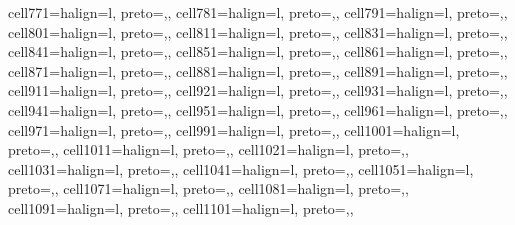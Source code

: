 \begin{table}
\begin{talltblr}
{cell{77}{1}={}{halign=l, preto={\hspace{1em}},},
cell{78}{1}={}{halign=l, preto={\hspace{1em}},},
cell{79}{1}={}{halign=l, preto={\hspace{1em}},},
cell{80}{1}={}{halign=l, preto={\hspace{1em}},},
cell{81}{1}={}{halign=l, preto={\hspace{1em}},},
cell{83}{1}={}{halign=l, preto={\hspace{1em}},},
cell{84}{1}={}{halign=l, preto={\hspace{1em}},},
cell{85}{1}={}{halign=l, preto={\hspace{1em}},},
cell{86}{1}={}{halign=l, preto={\hspace{1em}},},
cell{87}{1}={}{halign=l, preto={\hspace{1em}},},
cell{88}{1}={}{halign=l, preto={\hspace{1em}},},
cell{89}{1}={}{halign=l, preto={\hspace{1em}},},
cell{91}{1}={}{halign=l, preto={\hspace{1em}},},
cell{92}{1}={}{halign=l, preto={\hspace{1em}},},
cell{93}{1}={}{halign=l, preto={\hspace{1em}},},
cell{94}{1}={}{halign=l, preto={\hspace{1em}},},
cell{95}{1}={}{halign=l, preto={\hspace{1em}},},
cell{96}{1}={}{halign=l, preto={\hspace{1em}},},
cell{97}{1}={}{halign=l, preto={\hspace{1em}},},
cell{99}{1}={}{halign=l, preto={\hspace{1em}},},
cell{100}{1}={}{halign=l, preto={\hspace{1em}},},
cell{101}{1}={}{halign=l, preto={\hspace{1em}},},
cell{102}{1}={}{halign=l, preto={\hspace{1em}},},
cell{103}{1}={}{halign=l, preto={\hspace{1em}},},
cell{104}{1}={}{halign=l, preto={\hspace{1em}},},
cell{105}{1}={}{halign=l, preto={\hspace{1em}},},
cell{107}{1}={}{halign=l, preto={\hspace{1em}},},
cell{108}{1}={}{halign=l, preto={\hspace{1em}},},
cell{109}{1}={}{halign=l, preto={\hspace{1em}},},
cell{110}{1}={}{halign=l, preto={\hspace{1em}},},
}
\end{talltblr}
\end{table}
